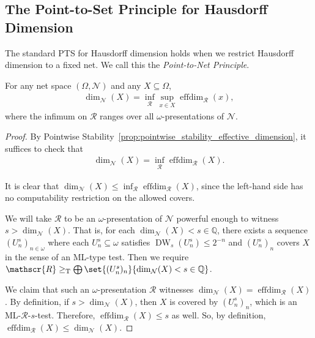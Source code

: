 \subsection{The Point-to-Set Principle for Hausdorff Dimension}

The standard PTS for Hausdorff dimension holds when we restrict Hausdorff dimension to a fixed net. We call this the \textit{Point-to-Net Principle}.

\begin{theorem}
    \label{theorem:point_to_net_for_single_net}
    For any net space $(\Omega, \mathcal{N})$ and any $X \subseteq \Omega$, 
    \begin{align*}
        \dim_{\mathcal{N}}(X) = \inf_{\mathscr{R}} \sup_{x \in X} \operatorname{effdim}_{\mathscr{R}}(x),
    \end{align*}
    where the infimum on $\mathscr{R}$ ranges over all $\omega$-presentations of $\mathcal{N}$.
\end{theorem}
\begin{proof}
    By Pointwise Stability~\ref{prop:pointwise_stability_effective_dimension}, it suffices to check that
    \begin{align*}
        \dim_{\mathcal{N}}(X) = \inf_{\mathscr{R}} \operatorname{effdim}_{\mathscr{R}}(X).
    \end{align*}
    
    It is clear that $\dim_{\mathcal{N}}(X) \leq \inf_{\mathscr{R}} \operatorname{effdim}_{\mathscr{R}}(X)$, since the left-hand side has no computability restriction on the allowed covers. 

    We will take $\mathscr{R}$ to be an $\omega$-presentation of $\mathcal{N}$ powerful enough to witness $s > \dim_{\mathcal{N}}(X)$. That is, for each $\dim_{\mathcal{N}}(X) < s \in \mathbb{Q}$, there exists a sequence $(U^s_n)_{n \in \omega}$ where each $U^s_n \subseteq \omega$ satisfies $\operatorname{DW}_s(U^s_n) \leq 2^{-n}$ and $(U^s_n)_n$ covers $X$ in the sense of an ML-type test. Then we require $\mathscr{R} \geq_{\operatorname{T}} \bigoplus \set{(U^s_n)_n}{\dim_{\mathcal{N}}(X) < s \in \mathbb{Q}}$.
    
    We claim that such an $\omega$-presentation $\mathscr{R}$ witnesses $\dim_{\mathcal{N}}(X) = \operatorname{effdim}_{\mathscr{R}}(X)$. By definition, if $s > \dim_{\mathcal{N}}(X)$, then $X$ is covered by $(U^s_n)_n$, which is an ML-$\mathscr{R}$-$s$-test. Therefore, $\operatorname{effdim}_{\mathscr{R}}(X) \leq s$ as well. So, by definition, $\operatorname{effdim}_{\mathscr{R}}(X) \leq \dim_{\mathcal{N}}(X)$.
\end{proof}

